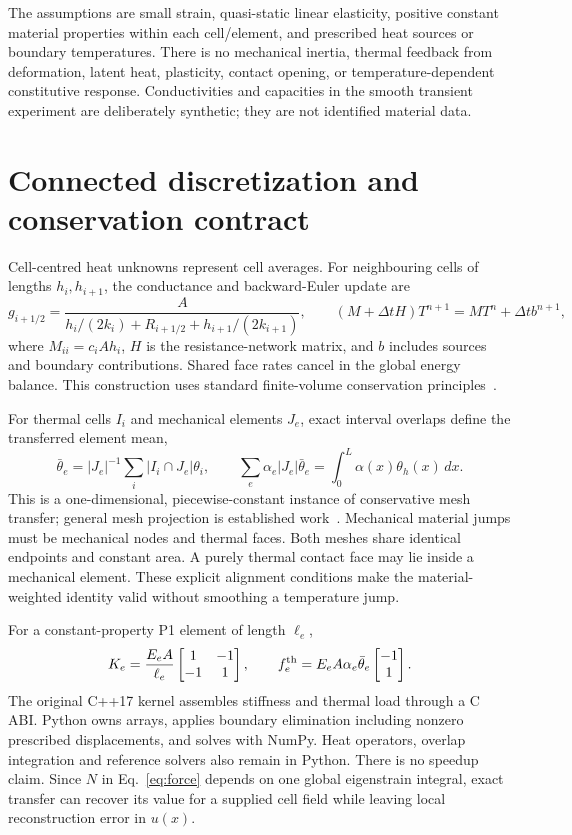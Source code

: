 \documentclass[10pt,a4paper]{article}
\begin{document}
The assumptions are small strain, quasi-static linear elasticity, positive constant material properties within each cell/element, and prescribed heat sources or boundary temperatures. There is no mechanical inertia, thermal feedback from deformation, latent heat, plasticity, contact opening, or temperature-dependent constitutive response. Conductivities and capacities in the smooth transient experiment are deliberately synthetic; they are not identified material data.

\section{Connected discretization and conservation contract}
Cell-centred heat unknowns represent cell averages. For neighbouring cells of lengths $h_i,h_{i+1}$, the conductance and backward-Euler update are
\begin{equation}
 g_{i+1/2}=\frac{A}{h_i/(2k_i)+R_{i+1/2}+h_{i+1}/(2k_{i+1})},\qquad
 (M+\Delta t H)T^{n+1}=MT^n+\Delta t b^{n+1},\label{eq:fv}
\end{equation}
where $M_{ii}=c_iAh_i$, $H$ is the resistance-network matrix, and $b$ includes sources and boundary contributions. Shared face rates cancel in the global energy balance. This construction uses standard finite-volume conservation principles~\cite{fv}.

For thermal cells $I_i$ and mechanical elements $J_e$, exact interval overlaps define the transferred element mean,
\begin{equation}
 \bar\theta_e=|J_e|^{-1}\sum_i |I_i\cap J_e|\theta_i,
 \qquad \sum_e\alpha_e|J_e|\bar\theta_e=\int_0^L\alpha(x)\theta_h(x)\,dx.\label{eq:overlap}
\end{equation}
This is a one-dimensional, piecewise-constant instance of conservative mesh transfer; general mesh projection is established work~\cite{transfer}. Mechanical material jumps must be mechanical nodes and thermal faces. Both meshes share identical endpoints and constant area. A purely thermal contact face may lie inside a mechanical element. These explicit alignment conditions make the material-weighted identity valid without smoothing a temperature jump.

For a constant-property P1 element of length $\ell_e$,
\begin{equation}
 K_e=\frac{E_eA}{\ell_e}\begin{bmatrix}1&-1\\-1&1\end{bmatrix},\qquad
 f_e^{\rm th}=E_eA\alpha_e\bar\theta_e\begin{bmatrix}-1\\1\end{bmatrix}.\label{eq:fe}
\end{equation}
The original C++17 kernel assembles stiffness and thermal load through a C ABI. Python owns arrays, applies boundary elimination including nonzero prescribed displacements, and solves with NumPy. Heat operators, overlap integration and reference solvers also remain in Python. There is no speedup claim. Since $N$ in Eq.~\eqref{eq:force} depends on one global eigenstrain integral, exact transfer can recover its value for a supplied cell field while leaving local reconstruction error in $u(x)$.
\end{document}
